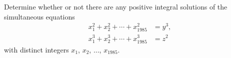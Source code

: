 Determine whether or not there are any positive integral solutions of the simultaneous equations\begin{align*}x_1^2+x_2^2+\cdots+x_{1985}^2&=y^3,\\

x_1^3+x_2^3+\cdots+x_{1985}^3&=z^2\end{align*}with distinct integers $x_1$,  $x_2$,  $\ldots$,  $x_{1985}$.